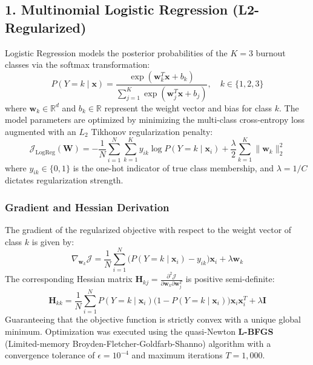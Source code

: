 \documentclass[12pt,a4paper,oneside]{report}
\begin{document}
\subsection{1. Multinomial Logistic Regression (L2-Regularized)}
Logistic Regression models the posterior probabilities of the $K=3$ burnout classes via the softmax transformation:
\begin{equation}
    P(Y = k \mid \mathbf{x}) = \frac{\exp(\mathbf{w}_k^T \mathbf{x} + b_k)}{\sum_{j=1}^K \exp(\mathbf{w}_j^T \mathbf{x} + b_j)}, \quad k \in \{1, 2, 3\}
    \label{eq:softmax_formulation}
\end{equation}
where $\mathbf{w}_k \in \mathbb{R}^d$ and $b_k \in \mathbb{R}$ represent the weight vector and bias for class $k$. The model parameters are optimized by minimizing the multi-class cross-entropy loss augmented with an $L_2$ Tikhonov regularization penalty:
\begin{equation}
    \mathcal{J}_{\text{LogReg}}(\mathbf{W}) = -\frac{1}{N} \sum_{i=1}^N \sum_{k=1}^K y_{ik} \log P(Y = k \mid \mathbf{x}_i) + \frac{\lambda}{2} \sum_{k=1}^K \|\mathbf{w}_k\|_2^2
    \label{eq:logreg_loss}
\end{equation}
where $y_{ik} \in \{0, 1\}$ is the one-hot indicator of true class membership, and $\lambda = 1/C$ dictates regularization strength. 

\subsubsection{Gradient and Hessian Derivation}
The gradient of the regularized objective with respect to the weight vector of class $k$ is given by:
\begin{equation}
    \nabla_{\mathbf{w}_k} \mathcal{J} = \frac{1}{N} \sum_{i=1}^N \Big( P(Y = k \mid \mathbf{x}_i) - y_{ik} \Big) \mathbf{x}_i + \lambda \mathbf{w}_k
\end{equation}
The corresponding Hessian matrix $\mathbf{H}_{kj} = \frac{\partial^2 \mathcal{J}}{\partial \mathbf{w}_k \partial \mathbf{w}_j^T}$ is positive semi-definite:
\begin{equation}
    \mathbf{H}_{kk} = \frac{1}{N} \sum_{i=1}^N P(Y = k \mid \mathbf{x}_i)\Big(1 - P(Y = k \mid \mathbf{x}_i)\Big) \mathbf{x}_i \mathbf{x}_i^T + \lambda \mathbf{I}
\end{equation}
Guaranteeing that the objective function is strictly convex with a unique global minimum. Optimization was executed using the quasi-Newton \textbf{L-BFGS} (Limited-memory Broyden-Fletcher-Goldfarb-Shanno) algorithm with a convergence tolerance of $\epsilon = 10^{-4}$ and maximum iterations $T = 1,000$.
\end{document}
